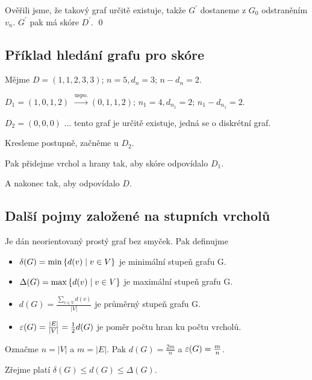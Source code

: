 Ověřili jsme, že takový graf určitě existuje, takže $G^\prime$ dostaneme z $G_0$ odstraněním $v_n$. $G^\prime$ pak má 
skóre $D^\prime$. \qed

\subsection{Příklad hledání grafu pro skóre}
Mějme $D = (1,1,2,3,3)$; $n=5, d_n=3$; $n-d_n=2$.

$D_1 = (1,0,1,2)$ $\overset{\text{uspo.}}{\rightarrow} (0,1,1,2)$; $n_1=4, d_{n_1} = 2$; $n_1 - d_{n_1}=2$.

$D_2 = (0, 0, 0)$ $\dots$ tento graf je určitě existuje, jedná se o diskrétní graf.

Kresleme postupně, začněme u $D_2$.
\begin{figure}[H]
\end{figure}
Pak přidejme vrchol a hrany tak, aby skóre odpovídalo $D_1$.
\begin{figure}[H]
\end{figure}
A nakonec tak, aby odpovídalo $D$.
\begin{figure}[H]
\end{figure}

\subsection{Další pojmy založené na stupních vrcholů}
 Je dán neorientovaný prostý graf bez smyček. Pak definujme
\begin{itemize}
    \item $\delta(G) = \min\left\lbrace d(v) \mid v \in V \right\rbrace$ je minimální stupeň grafu G.
    \item $\Delta(G) = \max\left\lbrace d(v) \mid v \in V \right\rbrace$ je maximální stupeň grafu G.
    \item $d(G) = \frac{\sum_{v \in V} d(v)}{|V|}$ je průměrný stupeň grafu G.
    \item $\varepsilon(G) = \frac{|E|}{|V|} = \frac{1}{2}d(G)$ je poměr počtu hran ku počtu vrcholů.
\end{itemize}
Označme $n = |V|$ a $m = |E|$. Pak $d(G) = \frac{2m}{n}$ a $\varepsilon(G) = \frac{m}{n}$. 

Zřejme platí $\delta(G) \leq d(G) \leq \Delta(G)$.